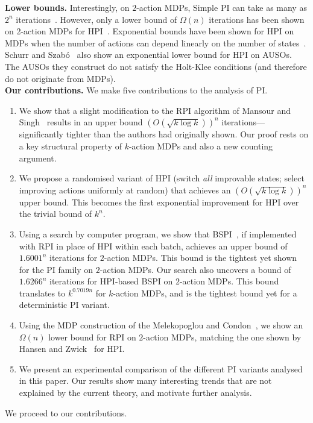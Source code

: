 \noindent\textbf{Lower bounds.} Interestingly, on $2$-action MDPs, Simple PI can take as many as $2^{n}$ iterations~\cite{Melekopoglou+Condon:1994}. However, only a lower bound of $\Omega(n)$ iterations has been shown on 2-action MDPs for HPI~\cite{Hansen+Zwick:2010}. Exponential bounds have been shown for HPI on MDPs when the number of actions can depend linearly on the
number of states~\cite{Fearnley:2010,Hollanders+DJ:2012}. Schurr and Szab\'{o}~ also show an exponential lower bound for HPI on AUSOs. The AUSOs they construct do not satisfy the Holt-Klee conditions (and therefore do not originate from MDPs).\\



\noindent\textbf{Our contributions.} We make five contributions to the analysis of PI. 

\begin{enumerate}

    \item We show that a slight modification to the RPI algorithm of Mansour and Singh~ results in an upper bound $(O(\sqrt{k\log k}))^{n}$ iterations---significantly tighter than the authors had originally shown. Our proof rests on a key structural property of $k$-action MDPs and also a new counting argument.

    \item We propose a randomised variant of HPI (switch \textit{all} improvable states; select improving actions uniformly at random) that achieves an $(O(\sqrt{k\log k}))^{n}$ upper bound. This becomes the first exponential improvement for HPI over the trivial bound of $k^{n}$.

    \item Using a search by computer program, we show that BSPI~\cite{Kalyanakrishnan+MG-bspi:2016}, if implemented with RPI in place of HPI within each batch, achieves an upper bound of $1.6001^{n}$ iterations for $2$-action MDPs. This bound is the tightest yet shown for the PI family on $2$-action MDPs. Our search also uncovers a bound of $1.6266^{n}$ iterations for HPI-based BSPI on $2$-action MDPs. This bound translates to $k^{0.7019n}$ for $k$-action MDPs, and is the tightest bound yet for a deterministic PI variant.

    \item Using the MDP construction of the Melekopoglou and Condon~, we show an $\Omega(n)$ lower bound for RPI on $2$-action MDPs, matching the one shown by Hansen and Zwick~ for HPI.
 
    \item We present an experimental comparison of the different PI variants analysed in this paper. Our results show many interesting trends that are not explained by the current theory, and motivate further analysis.
\end{enumerate}

We proceed to our contributions.
